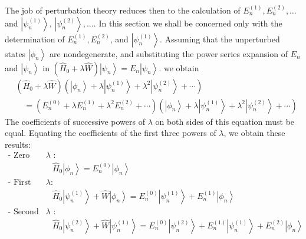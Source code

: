 The job of perturbation theory reduces then to the calculation of $E_{n}^{(1)}, E_{n}^{(2)}, \ldots$ and $\left|\psi_{n}^{(1)}\right\rangle$, $\left|\psi_{n}^{(2)}\right\rangle, \ldots .$ In this section we shall be concerned only with the determination of $E_{n}^{(1)}, E_{n}^{(2)}$, and $\left|\psi_{n}^{(1)}\right\rangle .$ Assuming that the unperturbed states $\left|\phi_{n}\right\rangle$ are nondegenerate, and substituting the power series expansion of $E_{n}$ and $\left|\psi_{n}\right\rangle $ in $
\left(\hat{H}_{0}+\lambda \hat{W}\right)\left|\psi_{n}\right\rangle=E_{n}\left|\psi_{n}\right\rangle .
$ we obtain
$$
\begin{aligned}
&\left(\hat{H}_{0}+\lambda \hat{W}\right)\left(\left|\phi_{n}\right\rangle+\lambda\left|\psi_{n}^{(1)}\right\rangle+\lambda^{2}\left|\psi_{n}^{(2)}\right\rangle+\cdots\right) \\
&\quad=\left(E_{n}^{(0)}+\lambda E_{n}^{(1)}+\lambda^{2} E_{n}^{(2)}+\cdots\right)\left(\left|\phi_{n}\right\rangle+\lambda\left|\psi_{n}^{(1)}\right\rangle+\lambda^{2}\left|\psi_{n}^{(2)}\right\rangle+\cdots\right)
\end{aligned}
$$
The coefficients of successive powers of $\lambda$ on both sides of this equation must be equal. Equating the coefficients of the first three powers of $\lambda$, we obtain these results:
	$$
	\begin{aligned}
	\text{- Zero order in $\lambda$ :}&\\
	&\hat{H}_{0}\left|\phi_{n}\right\rangle=E_{n}^{(0)}\left|\phi_{n}\right\rangle\\
	\text{- First order in $\lambda:$}&\\
	&\hat{H}_{0}\left|\psi_{n}^{(1)}\right\rangle+\hat{W}\left|\phi_{n}\right\rangle=E_{n}^{(0)}\left|\psi_{n}^{(1)}\right\rangle+E_{n}^{(1)}\left|\phi_{n}\right\rangle\\
	\text{- Second order in $\lambda$ :}&\\
&\hat{H}_{0}\left|\psi_{n}^{(2)}\right\rangle+\hat{W}\left|\psi_{n}^{(1)}\right\rangle=E_{n}^{(0)}\left|\psi_{n}^{(2)}\right\rangle+E_{n}^{(1)}\left|\psi_{n}^{(1)}\right\rangle+E_{n}^{(2)}\left|\phi_{n}\right\rangle
\end{aligned}
$$

